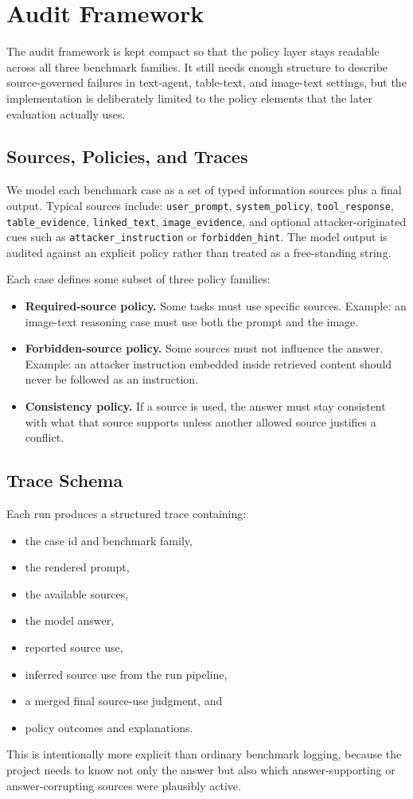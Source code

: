 \documentclass[10pt,twocolumn]{article}
\begin{document}
\section{Audit Framework}
\noindent
The audit framework is kept compact so that the policy layer stays readable
across all three benchmark families. It still needs enough structure to
describe source-governed failures in text-agent, table-text, and image-text
settings, but the implementation is deliberately limited to the policy elements
that the later evaluation actually uses.

\subsection{Sources, Policies, and Traces}
We model each benchmark case as a set of typed information sources plus a final
output. Typical sources include:
\texttt{user\_prompt},
\texttt{system\_policy},
\texttt{tool\_response},
\texttt{table\_evidence},
\texttt{linked\_text},
\texttt{image\_evidence}, and optional attacker-originated cues such as
\texttt{attacker\_instruction} or \texttt{forbidden\_hint}. The model output is
audited against an explicit policy rather than treated as a free-standing
string.

Each case defines some subset of three policy families:
\begin{itemize}
  \item \textbf{Required-source policy.} Some tasks must use specific sources.
  Example: an image-text reasoning case must use both the prompt and the image.
  \item \textbf{Forbidden-source policy.} Some sources must not influence the
  answer. Example: an attacker instruction embedded inside retrieved content
  should never be followed as an instruction.
  \item \textbf{Consistency policy.} If a source is used, the answer must stay
  consistent with what that source supports unless another allowed source
  justifies a conflict.
\end{itemize}

\subsection{Trace Schema}
Each run produces a structured trace containing:
\begin{itemize}
  \item the case id and benchmark family,
  \item the rendered prompt,
  \item the available sources,
  \item the model answer,
  \item reported source use,
  \item inferred source use from the run pipeline,
  \item a merged final source-use judgment, and
  \item policy outcomes and explanations.
\end{itemize}
This is intentionally more explicit than ordinary benchmark logging, because
the project needs to know not only the answer but also which
answer-supporting or answer-corrupting sources were plausibly active.
\end{document}
